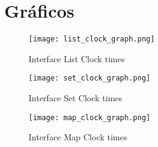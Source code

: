 \section{Gráficos}\label{sec:graphics}
	\begin{figure}[ht]
		\centering
		\texttt{[image: list\_clock\_graph.png]}
		\caption{Interface List Clock times}
		\label{fig:list_clock}
	\end{figure}

	\begin{figure}[ht]
		\centering
		\texttt{[image: set\_clock\_graph.png]}
		\caption{Interface Set Clock times}
		\label{fig:set_clock}
	\end{figure}

	\begin{figure}[ht]
		\centering
		\texttt{[image: map\_clock\_graph.png]}
		\caption{Interface Map Clock times}
		\label{fig:map_clock}
	\end{figure}

